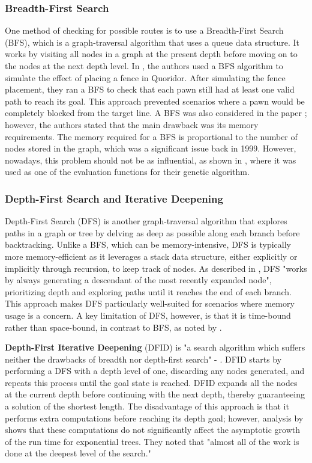 \documentclass[review]{cmpreport}
\begin{document}
\subsubsection{Breadth-First Search}
One method of checking for possible routes is to use a Breadth-First Search (BFS), which is a graph-traversal algorithm that uses a queue data structure. It works by visiting all nodes in a graph at the present depth before moving on to the nodes at the next depth level. In \cite{respall2018monte}, the authors used a BFS algorithm to simulate the effect of placing a fence in Quoridor. After simulating the fence placement, they ran a BFS to check that each pawn still had at least one valid path to reach its goal. This approach prevented scenarios where a pawn would be completely blocked from the target line. A BFS was also considered in the paper \cite{korf1999artificial}; however, the authors stated that the main drawback was its memory requirements. The memory required for a BFS is proportional to the number of nodes stored in the graph, which was a significant issue back in 1999. However, nowadays, this problem should not be as influential, as shown in \cite{josequoridor}, where it was used as one of the evaluation functions for their genetic algorithm.

\subsubsection{Depth-First Search and Iterative Deepening}
Depth-First Search (DFS) is another graph-traversal algorithm that explores paths in a graph or tree by delving as deep as possible along each branch before backtracking. Unlike a BFS, which can be memory-intensive, DFS is typically more memory-efficient as it leverages a stack data structure, either explicitly or implicitly through recursion, to keep track of nodes. As described in \cite{korf1985depth}, DFS "works by always generating a descendant of the most recently expanded node", prioritizing depth and exploring paths until it reaches the end of each branch. This approach makes DFS particularly well-suited for scenarios where memory usage is a concern. A key limitation of DFS, however, is that it is time-bound rather than space-bound, in contrast to BFS, as noted by \cite{korf1985depth}.

\noindent \textbf{Depth-First Iterative Deepening} (DFID) is "a search algorithm which suffers neither the drawbacks of breadth nor depth-first search" - \cite{korf1985depth}. DFID starts by performing a DFS with a depth level of one, discarding any nodes generated, and repeats this process until the goal state is reached. DFID expands all the nodes at the current depth before continuing with the next depth, thereby guaranteeing a solution of the shortest length. The disadvantage of this approach is that it performs extra computations before reaching its depth goal; however, analysis by \cite{korf1985depth} shows that these computations do not significantly affect the asymptotic growth of the run time for exponential trees. They noted that "almost all of the work is done at the deepest level of the search."
\end{document}
